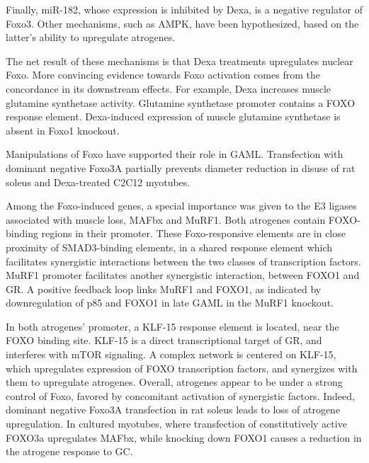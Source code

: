 \documentclass[12pt,english]{report}\usepackage[]{graphicx}\usepackage[]{color}
\begin{document}
Finally, miR-182, whose expression is inhibited by Dexa, is a negative
regulator of Foxo3\citep{hudson2014mir-182}. Other mechanisms, such
as AMPK, have been hypothesized, based on the latter's ability to
upregulate atrogenes.

The net result of these mechanisms is that Dexa treatments upregulates
nuclear Foxo\citep{qin2010protection}. More convincing evidence towards
Foxo activation comes from the concordance in its downstream effects.
For example, Dexa increases muscle glutamine synthetase activity\citep{king1983glutamine}.
Glutamine synthetase promoter contains a FOXO response element. Dexa-induced
expression of muscle glutamine synthetase is absent in Foxo1 knockout\citep{kamei2014foxo1}.

Manipulations of Foxo have supported their role in GAML. Transfection
with dominant negative Foxo3A partially prevents diameter reduction
in disuse of rat soleus and Dexa-treated C2C12 myotubes\citep{sandri2004foxo,senf2010foxo}.

Among the Foxo-induced genes, a special importance was given to the
E3 ligases associated with muscle loss, MAFbx and MuRF1\citep{stitt2004igf-1/pi3k/akt}.
Both atrogenes contain FOXO-binding regions in their promoter\citep{sandri2004foxo,sandri2006pgc-1alpha,waddell2008glucocorticoid}.
These Foxo-responsive elements are in close proximity of SMAD3-binding
elements, in a shared response element which facilitates synergistic
interactions between the two classes of transcription factors\citep{bollinger2014smad3}.
MuRF1 promoter facilitates another synergistic interaction, between
FOXO1 and GR\citep{waddell2008glucocorticoid}. A positive feedback
loop links MuRF1 and FOXO1, as indicated by downregulation of p85
and FOXO1 in late GAML in the MuRF1 knockout\citep{furlow2013altered}.

In both atrogenes' promoter, a KLF-15 response element is located,
near the FOXO binding site\citep{shimizu2011crosstalk}. KLF-15 is
a direct transcriptional target of GR, and interferes with mTOR signaling.
A complex network is centered on KLF-15, which upregulates expression
of FOXO transcription factors, and synergizes with them to upregulate
atrogenes. Overall, atrogenes appear to be under a strong control
of Foxo, favored by concomitant activation of synergistic factors.
Indeed, dominant negative Foxo3A transfection in rat soleus leads
to loss of atrogene upregulation\citep{senf2008hsp70}. In cultured
myotubes, where transfection of constitutively active FOXO3a upregulates
MAFbx\citep{sandri2004foxo}, while knocking down FOXO1 causes a reduction
in the atrogene response to GC\citep{smith2010sepsisa}.
\end{document}

